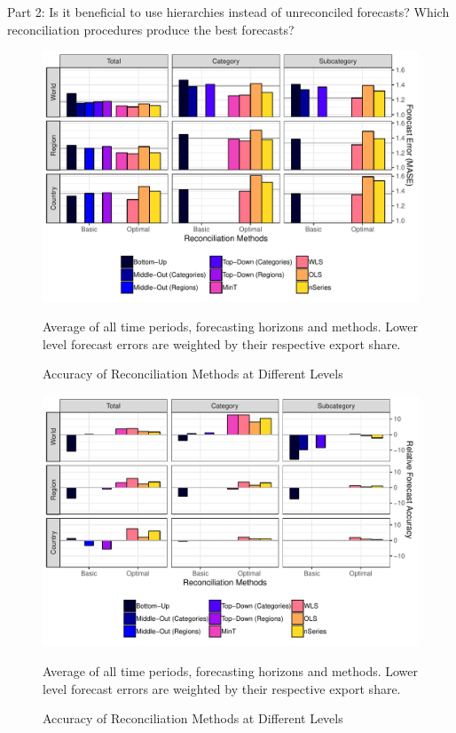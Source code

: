 \documentclass[a4paper,fleqn,11pt]{article}
\begin{document}
 Part 2: Is it beneficial to use hierarchies instead of unreconciled forecasts? Which reconciliation procedures produce the best forecasts?
 \begin{figure}[H]
 	\includegraphics[width=\textwidth]{fig/fig_eval_mase}
 	\caption{Accuracy of Reconciliation Methods at Different Levels}
 	\footnotesize{Average of all time periods, forecasting horizons and methods. Lower level forecast errors are weighted by their respective export share.}
 \end{figure}

 \begin{figure}[H]
	\includegraphics[width=\textwidth]{fig/fig_eval_rmse_relative}
	\caption{Accuracy of Reconciliation Methods at Different Levels}
	\footnotesize{Average of all time periods, forecasting horizons and methods. Lower level forecast errors are weighted by their respective export share.}
\end{figure}
\end{document}

